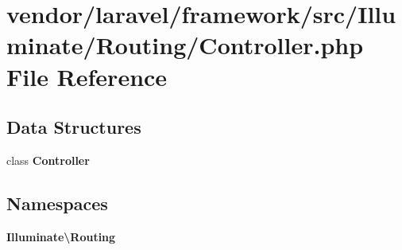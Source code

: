 \section{vendor/laravel/framework/src/\+Illuminate/\+Routing/\+Controller.php File Reference}
\label{vendor_2laravel_2framework_2src_2_illuminate_2_routing_2_controller_8php}
\subsection*{Data Structures}
\begin{DoxyCompactItemize}
\item 
class {\bf Controller}
\end{DoxyCompactItemize}
\subsection*{Namespaces}
\begin{DoxyCompactItemize}
\item 
 {\bf Illuminate\textbackslash{}\+Routing}
\end{DoxyCompactItemize}
